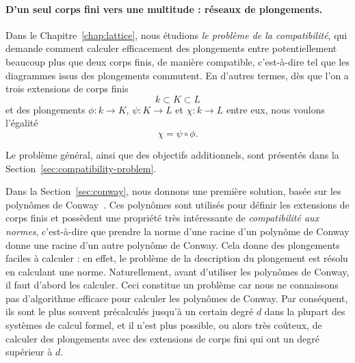 \paragraph{D'un seul corps fini vers une multitude : réseaux de plongements.}
Dans le Chapitre~\ref{chap:lattice}, nous étudions \emph{le problème de la
compatibilité}, qui demande comment calculer efficacement des plongements entre
potentiellement beaucoup plus que deux corps finis, de manière compatible,
c'est-à-dire tel que les diagrammes issus des plongements commutent. En d'autres
termes, dès que l'on a trois extensions de corps finis
\[
  k\subset K\subset L
\]
et des plongements $\phi:k\to K$, $\psi:K\to L$ et $\chi:k\to L$ entre eux, nous
voulons l'égalité
\[
  \chi = \psi\circ\phi.
\]
\begin{center}
\end{center}
Le problème général, ainsi que des objectifs additionnels, sont présentés dans
la Section~\ref{sec:compatibility-problem}.

Dans la Section~\ref{sec:conway}, nous donnons une première solution, basée sur
les polynômes de Conway~\cite{Parker90, Scheerhorn92}. Ces polynômes sont
utilisés pour définir les extensions de corps finis et possèdent une propriété
très intéressante de \emph{compatibilité aux normes}, c'est-à-dire que prendre
la norme d'une racine d'un polynôme de Conway donne une racine d'un autre
polynôme de Conway. Cela donne des plongements faciles à calculer : en effet, le
problème de la description du plongement est résolu en calculant une norme.
Naturellement, avant d'utiliser les polynômes de Conway, il faut d'abord les
calculer. Ceci constitue un problème car nous ne connaissons pas d'algorithme
efficace pour calculer les polynômes de Conway. Par conséquent, ils sont le plus
souvent précalculés jusqu'à un certain degré $d$ dans la plupart des systèmes de
calcul formel, et il n'est plus possible, ou alors très coûteux, de calculer des
plongements avec des extensions de corps fini qui ont un degré supérieur à $d$.

